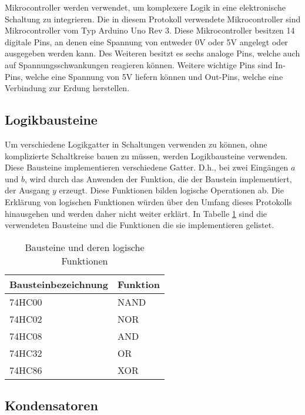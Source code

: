 Mikrocontroller werden verwendet, um komplexere Logik in eine elektronische Schaltung zu integrieren.
Die in diesem Protokoll verwendete Mikrocontroller sind Mikrocontroller vom Typ Arduino Uno Rev 3.
Diese Mikrocontroller besitzen 14 digitale Pins, an denen eine Spannung von entweder 0V oder 5V angelegt oder ausgegeben werden kann.
Des Weiteren besitzt es sechs analoge Pins, welche auch auf Spannungsschwankungen reagieren können.
Weitere wichtige Pins sind In-Pins, welche eine Spannung von 5V liefern können und Out-Pins, welche eine Verbindung zur Erdung herstellen.

\subsection{Logikbausteine}
\label{subsec:logikbausteine}

Um verschiedene Logikgatter in Schaltungen verwenden zu können, ohne komplizierte Schaltkreise bauen zu müssen, werden Logikbausteine verwenden.
Diese Bausteine implementieren verschiedene Gatter.
D.h., bei zwei Eingängen $a$ und $b$, wird durch das Anwenden der Funktion, die der Baustein implementiert, der Ausgang $y$ erzeugt.
Diese Funktionen bilden logische Operationen ab.
Die Erklärung von logischen Funktionen würden über den Umfang dieses Protokolls hinausgehen und werden daher nicht weiter erklärt.
In Tabelle \ref{tab:bausteine-und-deren-logische-funktionen} sind die verwendeten Bausteine und die Funktionen die sie implementieren gelistet.

\begin{table}[ht]
    \centering
    \caption{Bausteine und deren logische Funktionen}
    \label{tab:bausteine-und-deren-logische-funktionen}
    \begin{tabular}{| l | l |}
        \hline
        Bausteinbezeichnung & Funktion \\
        \hline
        74HC00              & NAND     \\
        74HC02              & NOR      \\
        74HC08              & AND      \\
        74HC32              & OR       \\
        74HC86              & XOR      \\
        \hline
    \end{tabular}
\end{table}

\subsection{Kondensatoren}
\label{subsec:kondensatoren}


